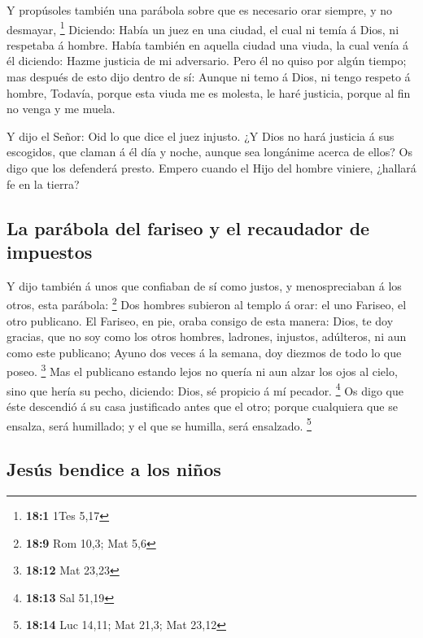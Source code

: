  Y propúsoles también una parábola sobre que es necesario
orar siempre, y no desmayar, \footnote{\textbf{18:1} 1Tes 5,17}
 Diciendo: Había un juez en una ciudad, el cual ni temía á
Dios, ni respetaba á hombre.  Había también en aquella
ciudad una viuda, la cual venía á él diciendo: Hazme justicia de mi
adversario.  Pero él no quiso por algún tiempo; mas después
de esto dijo dentro de sí: Aunque ni temo á Dios, ni tengo respeto á
hombre,  Todavía, porque esta viuda me es molesta, le haré
justicia, porque al fin no venga y me muela.

 Y dijo el Señor: Oid lo que dice el juez injusto.
 ¿Y Dios no hará justicia á sus escogidos, que claman á él
día y noche, aunque sea longánime acerca de ellos?  Os digo
que los defenderá presto. Empero cuando el Hijo del hombre viniere,
¿hallará fe en la tierra?

\hypertarget{la-paruxe1bola-del-fariseo-y-el-recaudador-de-impuestos}{%
\subsection{La parábola del fariseo y el recaudador de
impuestos}\label{la-paruxe1bola-del-fariseo-y-el-recaudador-de-impuestos}}

 Y dijo también á unos que confiaban de sí como justos, y
menospreciaban á los otros, esta parábola: \footnote{\textbf{18:9} Rom
  10,3; Mat 5,6}  Dos hombres subieron al templo á orar: el
uno Fariseo, el otro publicano.  El Fariseo, en pie, oraba
consigo de esta manera: Dios, te doy gracias, que no soy como los otros
hombres, ladrones, injustos, adúlteros, ni aun como este publicano;
 Ayuno dos veces á la semana, doy diezmos de todo lo que
poseo. \footnote{\textbf{18:12} Mat 23,23}  Mas el
publicano estando lejos no quería ni aun alzar los ojos al cielo, sino
que hería su pecho, diciendo: Dios, sé propicio á mí pecador.
\footnote{\textbf{18:13} Sal 51,19}  Os digo que éste
descendió á su casa justificado antes que el otro; porque cualquiera que
se ensalza, será humillado; y el que se humilla, será ensalzado.
\footnote{\textbf{18:14} Luc 14,11; Mat 21,3; Mat 23,12}

\hypertarget{jesuxfas-bendice-a-los-niuxf1os}{%
\subsection{Jesús bendice a los
niños}\label{jesuxfas-bendice-a-los-niuxf1os}}

